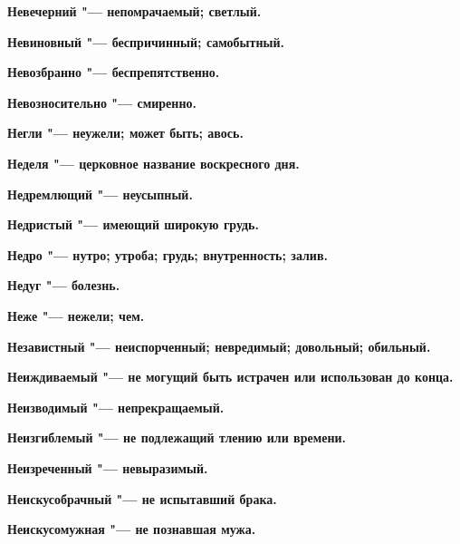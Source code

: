 \bfseries Невечерний \normalfont{} "--- непомрачаемый; светлый. 




\bfseries Невиновный \normalfont{} "--- беспричинный; самобытный. 




\bfseries Невозбранно \normalfont{} "--- беспрепятственно. 




\bfseries Невозносительно \normalfont{} "--- смиренно. 




\bfseries Негли \normalfont{} "--- неужели; может быть; авось. 




\bfseries Неделя \normalfont{} "--- церковное название воскресного дня. 




\bfseries Недремлющий \normalfont{} "--- неусыпный. 




\bfseries Недристый \normalfont{} "--- имеющий широкую грудь. 




\bfseries Недро \normalfont{} "--- нутро; утроба; грудь; внутренность; залив. 




\bfseries Недуг \normalfont{} "--- болезнь. 




\bfseries Неже \normalfont{} "--- нежели; чем. 




\bfseries Независтный \normalfont{} "--- неиспорченный; невредимый; довольный; обильный. 




\bfseries Неиждиваемый \normalfont{} "--- не могущий быть истрачен или использован до конца. 




\bfseries Неизводимый \normalfont{} "--- непрекращаемый. 




\bfseries Неизгиблемый \normalfont{} "--- не подлежащий тлению или времени. 




\bfseries Неизреченный \normalfont{} "--- невыразимый. 




\bfseries Неискусобрачный \normalfont{} "--- не испытавший брака. 




\bfseries Неискусомужная \normalfont{} "--- не познавшая мужа. 




